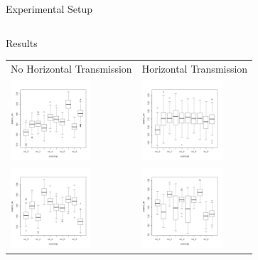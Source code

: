 \documentclass[12pt, notes=show]{beamer}
\begin{document}
\begin{frame}{Experimental Setup}
\begin{tabular}{m{5cm}m{5cm}}
    \end{tabular}

\end{frame}

\begin{frame}{Results}

    \begin{center}
	\begin{tabular}{m{3cm}m{3cm}}

	    {\tiny \hspace{.3cm}No Horizontal Transmission} & {\centering\tiny Horizontal Transmission }\\
	    \includegraphics[height=3cm]{images/CNDL.png}
	    &
	    \includegraphics[height=3cm]{images/CYDL.png}

	    \\
	    \includegraphics[height=3cm]{images/CNDS.png}
	    &
	    \includegraphics[height=3cm]{images/CYDS.png}
	    \\

	\end{tabular}

    \end{center}
	
\end{frame}
\end{document}
